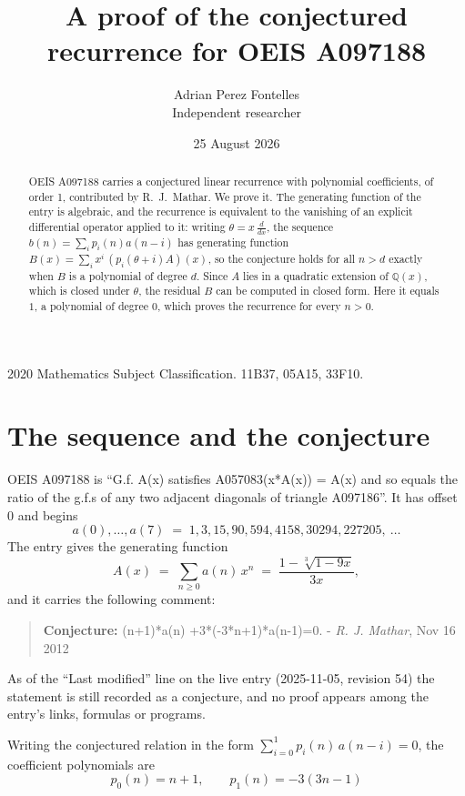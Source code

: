 \documentclass[11pt,a4paper]{article}
\title{A proof of the conjectured recurrence for OEIS A097188}
\author{Adrian Perez Fontelles\\ \small Independent researcher}
\date{25 August 2026}
\theoremstyle{plain}
\theoremstyle{definition}
\begin{document}
\maketitle

\begin{abstract}
OEIS A097188 carries a conjectured linear recurrence with polynomial coefficients, of
order 1, contributed by R.~J.~Mathar. We prove it. The generating function of the
entry is algebraic, and the recurrence is equivalent to the vanishing of an explicit
differential operator applied to it: writing $\theta=x\,\frac{d}{dx}$, the sequence
$b(n)=\sum_{i}p_{i}(n)a(n-i)$ has generating function
$B(x)=\sum_{i}x^{i}\,(p_{i}(\theta+i)A)(x)$, so the conjecture holds for all $n>d$ exactly
when $B$ is a polynomial of degree $d$. Since $A$ lies in a quadratic extension of
$\mathbb{Q}(x)$, which is closed under $\theta$, the residual $B$ can be computed in
closed form. Here it equals $1$, a polynomial of degree $0$, which proves
the recurrence for every $n>0$.
\end{abstract}

\noindent\small 2020 Mathematics Subject Classification. 11B37, 05A15, 33F10.\normalsize

\section{The sequence and the conjecture}

OEIS A097188 is ``G.f. A(x) satisfies A057083(x*A(x)) = A(x) and so equals the ratio of the g.f.s of any two adjacent diagonals of triangle A097186''. It has offset $0$ and begins
\[
a(0),\dots,a(7)\;=\;1, 3, 15, 90, 594, 4158, 30294, 227205,\ \dots
\]
The entry gives the generating function
\begin{equation}\label{eq:gf}
A(x)\;=\;\sum_{n\ge 0} a(n)\,x^{n}\;=\;\frac{1 - \sqrt[3]{1 - 9 x}}{3 x} ,
\end{equation}
and it carries the following comment:
\begin{quote}\small
\textbf{Conjecture:} (n+1)*a(n) +3*(-3*n+1)*a(n-1)=0. - \emph{R. J. Mathar}, Nov 16 2012
\end{quote}
As of the ``Last modified'' line on the live entry (2025-11-05, revision 54) the
statement is still recorded as a conjecture, and no proof appears among the entry's links,
formulas or programs.

Writing the conjectured relation in the form $\sum_{i=0}^{1}p_{i}(n)\,a(n-i)=0$,
the coefficient polynomials are
\[
p_{0}(n)=n + 1,\qquad p_{1}(n)=- 3 \left(3 n - 1\right)
\]
\end{document}
